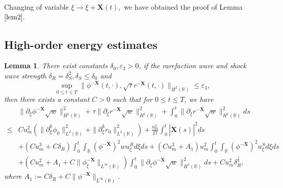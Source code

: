 \documentclass[10pt,reqno]{amsart}
\numberwithin{equation}{section}
\newtheorem{lemma}[theorem]{Lemma}
\begin{document}
	Changing of variable $\xi\to\xi+\mathbf{X}(t),$ we have obtained the proof of Lemma $\ref{lem2}.$
	
	\subsection{High-order energy estimates}
	\begin{lemma}\label{lem8}
		 There exist constants $\delta_{0},\varepsilon_{3}>0$, if the rarefaction wave and shock wave strength $\delta_{R}=\delta_{S}^2,\delta_{S}\leq \delta_{0}$ and $$\sup_{0\leq t\leq T} \|\phi^{-\mathbf{X}}(t,\cdot), \sqrt{\tau}r^{-\mathbf{X}}(t,\cdot)\|_{H^2(\mathbb{R})} \leq \varepsilon_{3},$$ then there exists a constant $C>0$ such that for $0\leq t\leq T$, we have 
		\begin{equation}\label{HEE}
			\begin{aligned}
				&\|\partial_{\xi}\phi^{-\mathbf{X}}\sqrt{w}\|_{H^1(\mathbb{R})}^2+\tau\|\partial_{\xi}r^{-\mathbf{X}}\sqrt{w}\|_{H^1(\mathbb{R})}^2+\int_{0}^t\|\partial_{\xi}r^{-\mathbf{X}}\sqrt{w}\|_{H^1(\mathbb{R})}^2 ds\\
				\leq&Cu_m^2\left(\|\partial_{\xi}^k \phi_{0}\|_{L^{2}(\mathbb{R})}^2+\|\partial_{\xi}^kr_{0}\|_{L^{2}(\mathbb{R})}^2\right)+\frac{u_m^2}{27}\int_{0}^t\left|\dot{\mathbf{X}}(s)\right|^2ds\\
				&+\left(Cu_m^3+C\delta_{R}\right)\int_{0}^t\int_{\mathbb{R}}(\phi^{-\mathbf{X}})^2wu_{\xi}^Rd\xi ds+(Cu_m^3+A_1)u_m^2\int_{0}^t\int_{\mathbb{R}}(\phi^{-\mathbf{X}})^2u_{\xi}^Sd\xi ds\\
				&+\left(Cu_m^2+A_1+C\|\phi_{\xi}^{-\mathbf{X}}\|_{L^{\infty}(\mathbb{R})}\right)\int_{0}^t\|\partial_{\xi}\phi^{-\mathbf{X}}\sqrt{w}\|_{H^1(\mathbb{R})}^2 ds+Cu_m^2\delta_{R}^{\frac{1}{6}},
			\end{aligned}
		\end{equation}
		where  $A_1:=C\delta_R+C\|\phi^{-\mathbf{X}}\|_{L^{\infty}(\mathbb{R})}$.
	\end{lemma}
\end{document}
